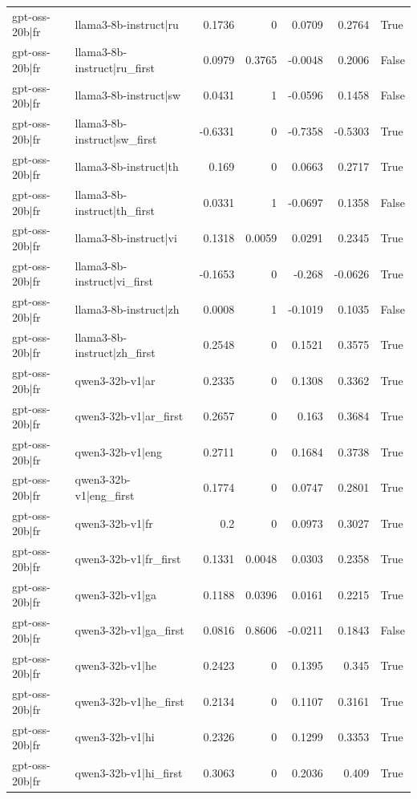 \begin{table}
\begin{tabular}{l l r r r r l}
gpt-oss-20b|fr & llama3-8b-instruct|ru & 0.1736 & 0 & 0.0709 & 0.2764 & True \\
gpt-oss-20b|fr & llama3-8b-instruct|ru_first & 0.0979 & 0.3765 & -0.0048 & 0.2006 & False \\
gpt-oss-20b|fr & llama3-8b-instruct|sw & 0.0431 & 1 & -0.0596 & 0.1458 & False \\
gpt-oss-20b|fr & llama3-8b-instruct|sw_first & -0.6331 & 0 & -0.7358 & -0.5303 & True \\
gpt-oss-20b|fr & llama3-8b-instruct|th & 0.169 & 0 & 0.0663 & 0.2717 & True \\
gpt-oss-20b|fr & llama3-8b-instruct|th_first & 0.0331 & 1 & -0.0697 & 0.1358 & False \\
gpt-oss-20b|fr & llama3-8b-instruct|vi & 0.1318 & 0.0059 & 0.0291 & 0.2345 & True \\
gpt-oss-20b|fr & llama3-8b-instruct|vi_first & -0.1653 & 0 & -0.268 & -0.0626 & True \\
gpt-oss-20b|fr & llama3-8b-instruct|zh & 0.0008 & 1 & -0.1019 & 0.1035 & False \\
gpt-oss-20b|fr & llama3-8b-instruct|zh_first & 0.2548 & 0 & 0.1521 & 0.3575 & True \\
gpt-oss-20b|fr & qwen3-32b-v1|ar & 0.2335 & 0 & 0.1308 & 0.3362 & True \\
gpt-oss-20b|fr & qwen3-32b-v1|ar_first & 0.2657 & 0 & 0.163 & 0.3684 & True \\
gpt-oss-20b|fr & qwen3-32b-v1|eng & 0.2711 & 0 & 0.1684 & 0.3738 & True \\
gpt-oss-20b|fr & qwen3-32b-v1|eng_first & 0.1774 & 0 & 0.0747 & 0.2801 & True \\
gpt-oss-20b|fr & qwen3-32b-v1|fr & 0.2 & 0 & 0.0973 & 0.3027 & True \\
gpt-oss-20b|fr & qwen3-32b-v1|fr_first & 0.1331 & 0.0048 & 0.0303 & 0.2358 & True \\
gpt-oss-20b|fr & qwen3-32b-v1|ga & 0.1188 & 0.0396 & 0.0161 & 0.2215 & True \\
gpt-oss-20b|fr & qwen3-32b-v1|ga_first & 0.0816 & 0.8606 & -0.0211 & 0.1843 & False \\
gpt-oss-20b|fr & qwen3-32b-v1|he & 0.2423 & 0 & 0.1395 & 0.345 & True \\
gpt-oss-20b|fr & qwen3-32b-v1|he_first & 0.2134 & 0 & 0.1107 & 0.3161 & True \\
gpt-oss-20b|fr & qwen3-32b-v1|hi & 0.2326 & 0 & 0.1299 & 0.3353 & True \\
gpt-oss-20b|fr & qwen3-32b-v1|hi_first & 0.3063 & 0 & 0.2036 & 0.409 & True \\

\end{tabular}
\end{table}
